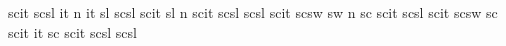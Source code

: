   {scit}  {scsl}
 {it}    {}
 {n}    {}
%
  {it}    {sl}
  {scsl}  {scit}
 {sl}    {}
 {n}    {}
%
  {scit}  {scsl}
  {scsl}  {scit}
  {scsw}  {sw}   
 {n}     {}
 {sc}     {}
%
  {scit}  {}
  {scsl}  {scit}
  {scsw}  {sc}    %
  {scit}  {}
 {it}    {}
 {sc}    {}
%
  {scit}  {scsl}
  {scsl}  {}
